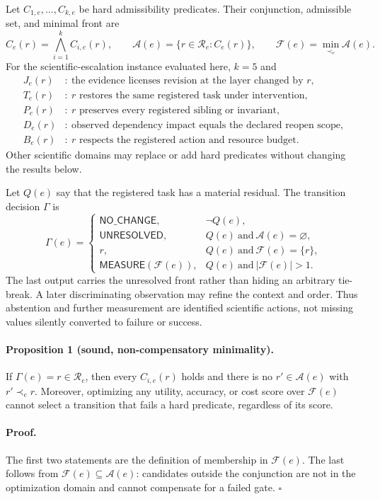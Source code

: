 Let $C_{1,e},\ldots,C_{k,e}$ be hard admissibility predicates. Their
conjunction, admissible set, and minimal front are
\[
 C_e(r)=\bigwedge_{i=1}^{k}C_{i,e}(r),\qquad
 \mathcal A(e)=\{r\in\mathcal R_e:C_e(r)\},\qquad
 \mathcal F(e)=\min_{\prec_e}\mathcal A(e).
\]
For the scientific-escalation instance evaluated here, $k=5$ and
\begin{align*}
J_e(r)&:\ \text{the evidence licenses revision at the layer changed by $r$},\\
T_e(r)&:\ \text{$r$ restores the same registered task under intervention},\\
P_e(r)&:\ \text{$r$ preserves every registered sibling or invariant},\\
D_e(r)&:\ \text{observed dependency impact equals the declared reopen scope},\\
B_e(r)&:\ \text{$r$ respects the registered action and resource budget}.
\end{align*}
Other scientific domains may replace or add hard predicates without changing
the results below.

Let $Q(e)$ say that the registered task has a material residual. The
transition decision $\Gamma$ is
\[
\Gamma(e)=
\begin{cases}
\mathsf{NO\_CHANGE}, & \neg Q(e),\\
\mathsf{UNRESOLVED}, & Q(e)\ \text{and}\ \mathcal A(e)=\varnothing,\\
r, & Q(e)\ \text{and}\ \mathcal F(e)=\{r\},\\
\mathsf{MEASURE}(\mathcal F(e)), & Q(e)\ \text{and}\
|\mathcal F(e)|>1.
\end{cases}
\]
The last output carries the unresolved front rather than hiding an arbitrary
tie-break. A later discriminating observation may refine the context and
order. Thus abstention and further measurement are identified scientific
actions, not missing values silently converted to failure or success.

\paragraph{Proposition 1 (sound, non-compensatory minimality).}
If $\Gamma(e)=r\in\mathcal R_e$, then every $C_{i,e}(r)$ holds and there is no
$r'\in\mathcal A(e)$ with $r'\prec_e r$. Moreover, optimizing any utility,
accuracy, or cost score over $\mathcal F(e)$ cannot select a transition that
fails a hard predicate, regardless of its score.

\paragraph{Proof.}
The first two statements are the definition of membership in
$\mathcal F(e)$. The last follows from
$\mathcal F(e)\subseteq\mathcal A(e)$: candidates outside the conjunction are
not in the optimization domain and cannot compensate for a failed gate.
\hfill$\square$

